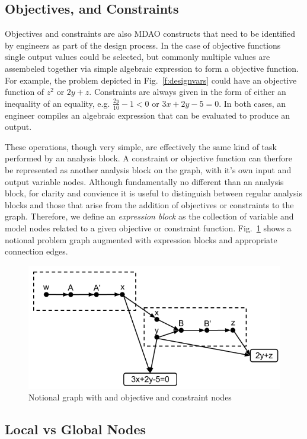 \subsection{Objectives, and Constraints}
Objectives and constraints are also MDAO constructs that need to be identified by engineers 
as part of the design process. In the case of objective functions single output values 
could be selected, but commonly multiple values are assembeled together via simple 
algebraic expression to form a objective function. For example, the problem depicted in 
Fig.~\ref{f:designvars} could have an objective function of $z^2$ or $2y + z$. Constraints are 
always given in the form of either an inequality of an equality, e.g. 
$\frac{2y}{10}-1<0$ or $3x+2y - 5=0$. In both cases, an engineer compiles an
algebraic expression that can be evaluated to produce an output. 

These operations, though very simple, are effectively the same kind of task 
performed by an analysis block. A constraint or objective function can therfore 
be represented as another analysis block on the graph, with it's own input and 
output variable nodes. Although fundamentally no different than an analysis block, 
for clarity and convience it is useful to distinguish between regular analysis 
blocks and those that arise from the addition of objectives or constraints to 
the graph. Therefore, we define an \emph{expression block} as the collection of variable and model 
nodes related to a given objective or constraint function. Fig.~\ref{f:obj-cons}
shows a notional problem graph augmented with expression blocks and appropriate 
connection edges. 


\begin{figure}[htb!]
  \begin{center}
    \includegraphics[width=.6\textwidth]{images/obj_const_graph}
  \end{center}
  \caption{Notional graph with and objective and constraint nodes \label{f:obj-cons}}
\end{figure}


\subsection{Local vs Global Nodes}

